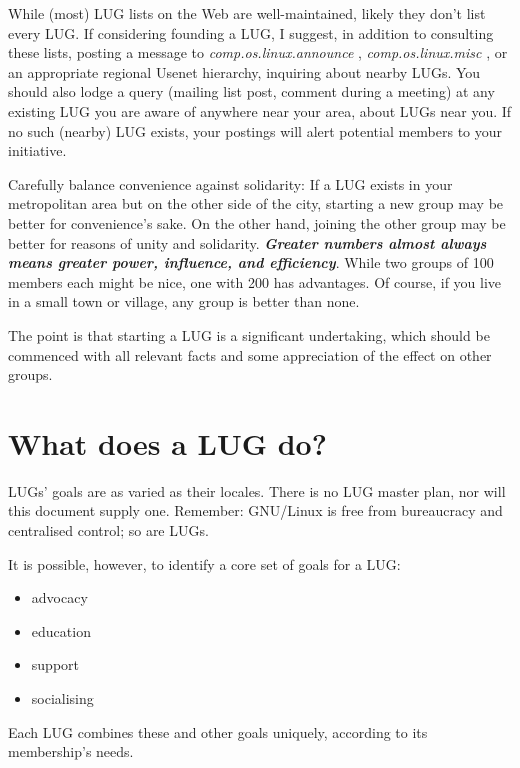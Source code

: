\documentclass{HOWTO}
\begin{document}
While (most) LUG lists on the Web are well-maintained, likely they don't
list every LUG. If considering founding a LUG, I suggest, in addition to
consulting these lists, posting a message to 
\emph{comp.os.linux.announce} \texttt{\aciurl}
, 
\emph{comp.os.linux.misc} \texttt{\acjurl}
, or an
appropriate regional Usenet hierarchy, inquiring about nearby LUGs. You
should also lodge a query (mailing list post, comment during a meeting)
at any existing LUG you are aware of anywhere near your area,
about LUGs near you.  If no such (nearby) LUG exists, your postings will
alert potential members to your initiative.

Carefully balance convenience against solidarity:  If a LUG exists in
your metropolitan area but on the other side of the city, starting a new
group may be better for convenience's sake. On the other hand, joining
the other group may be better for reasons of unity and solidarity.
{\bfseries {\itshape Greater numbers almost always means greater power, influence,
and efficiency\/}}. While two groups of 100 members each might be
nice, one with 200 has advantages. Of course, if you live in a small
town or village, any group is better than none.

The point is that starting a LUG is a significant undertaking, which
should be commenced with all relevant facts and some appreciation of the
effect on other groups.




\section{What does a LUG do?}

LUGs' goals are as varied as their locales.  There is no LUG master
plan, nor will this document supply one. Remember: GNU/Linux is free from
bureaucracy and centralised control; so are LUGs.

It is possible, however, to identify a core set of goals for a 
LUG:

\begin{itemize}
\item advocacy
\item education
\item support
\item socialising
\end{itemize}


Each LUG combines these and other goals uniquely, according to its
membership's needs.
\end{document}
